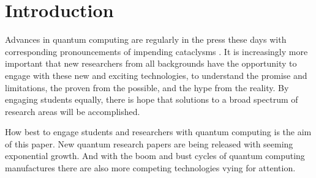 \section{Introduction}

Advances in quantum computing are regularly in the press these days \cite{google:willow:2024} with corresponding pronouncements
of impending cataclysms \cite{ava-labs-c-founder-on-bitcoin-vulnerability}.  It is increasingly more important that new
researchers from all backgrounds have the opportunity to engage with these new and exciting technologies, to understand the
promise and limitations, the proven from the possible, and the hype from the reality.  By engaging students equally, there
is hope that solutions to a broad spectrum of research areas will be accomplished.

How best to engage students and researchers with quantum computing is the aim of this paper.  New quantum research papers are
being released with seeming exponential growth.  And with the boom and bust cycles of quantum computing manufactures \cite{the-recent-bust}
\cite{the-more-recent-boom} there are also more competing technologies vying for attention.



